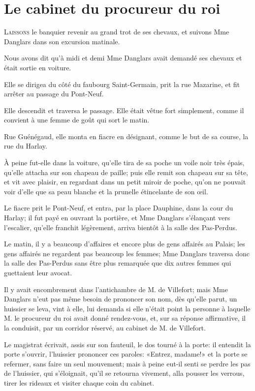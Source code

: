 \chapter{Le cabinet du procureur du roi}

\lettrine{L}{aissons} le banquier revenir au grand trot de ses chevaux, et suivons Mme Danglars dans son excursion matinale. 

\zz
Nous avons dit qu'à midi et demi Mme Danglars avait demandé ses chevaux et était sortie en voiture. 

Elle se dirigea du côté du faubourg Saint-Germain, prit la rue Mazarine, et fit arrêter au passage du Pont-Neuf. 

Elle descendit et traversa le passage. Elle était vêtue fort simplement, comme il convient à une femme de goût qui sort le matin. 

Rue Guénégaud, elle monta en fiacre en désignant, comme le but de sa course, la rue du Harlay. 

À peine fut-elle dans la voiture, qu'elle tira de sa poche un voile noir très épais, qu'elle attacha sur son chapeau de paille; puis elle remit son chapeau sur sa tête, et vit avec plaisir, en regardant dans un petit miroir de poche, qu'on ne pouvait voir d'elle que sa peau blanche et la prunelle étincelante de son œil. 

Le fiacre prit le Pont-Neuf, et entra, par la place Dauphine, dans la cour du Harlay; il fut payé en ouvrant la portière, et Mme Danglars s'élançant vers l'escalier, qu'elle franchit légèrement, arriva bientôt à la salle des Pas-Perdus. 

Le matin, il y a beaucoup d'affaires et encore plus de gens affairés au Palais; les gens affairés ne regardent pas beaucoup les femmes; Mme Danglars traversa donc la salle des Pas-Perdus sans être plus remarquée que dix autres femmes qui guettaient leur avocat. 

Il y avait encombrement dans l'antichambre de M. de Villefort; mais Mme Danglars n'eut pas même besoin de prononcer son nom, dès qu'elle parut, un huissier se leva, vint à elle, lui demanda si elle n'était point la personne à laquelle M. le procureur du roi avait donné rendez-vous, et, sur sa réponse affirmative, il la conduisit, par un corridor réservé, au cabinet de M. de Villefort. 

Le magistrat écrivait, assis sur son fauteuil, le dos tourné à la porte: il entendit la porte s'ouvrir, l'huissier prononcer ces paroles: «Entrez, madame!» et la porte se refermer, sans faire un seul mouvement; mais à peine eut-il senti se perdre les pas de l'huissier, qui s'éloignait, qu'il se retourna vivement, alla pousser les verrous, tirer les rideaux et visiter chaque coin du cabinet. 

